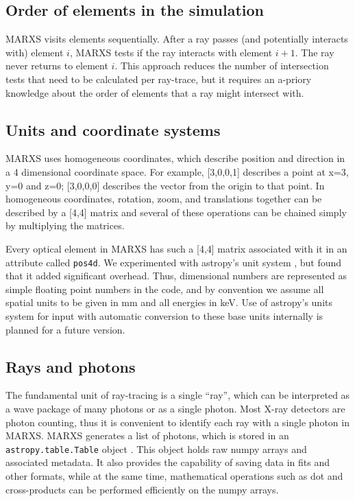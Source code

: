 \documentclass[twocolumn]{aastex61}
\begin{document}
\subsection{Order of elements in the simulation}
MARXS visits elements sequentially. After a ray passes (and potentially
interacts with) element $i$, MARXS tests if the ray interacts with element
$i+1$. The ray never returns to element $i$. This approach reduces the number
of intersection tests that need to be calculated per ray-trace, but it requires
an a-priory knowledge about the order of elements that a ray might intersect
with.

\subsection{Units and coordinate systems}
MARXS uses homogeneous coordinates, which describe position and direction in a
4 dimensional coordinate space. For example, [3,0,0,1] describes a point at
x=3, y=0 and z=0; [3,0,0,0] describes the vector from the origin to that
point. In homogeneous coordinates, rotation, zoom, and translations together can
be described by a [4,4] matrix and several of these operations can be chained
simply by multiplying the matrices.

Every optical element in MARXS has such a [4,4] matrix associated with it in an
attribute called \texttt{pos4d}. We experimented with astropy's unit system
\citep{2013A&A...558A..33A}, but found that it added significant
overhead. Thus, dimensional numbers are represented as simple floating point
numbers in the code, and by convention we assume all spatial units to be given
in mm and all energies in keV. Use of astropy's units system for input with
automatic conversion to these base units internally is planned for a future
version.

\subsection{Rays and photons}
The fundamental unit of ray-tracing is a single ``ray'', which can be
interpreted as a wave package of many photons or as a single
photon. Most X-ray detectors are photon counting, thus it is
convenient to identify each ray with a single photon in MARXS.
MARXS generates a list of photons, which is stored in an
\texttt{astropy.table.Table} object \citep{2013A&A...558A..33A}. This object
holds raw numpy arrays and associated metadata. It also provides the capability
of saving data in fits and other formats, while at the same time, mathematical
operations such as dot and cross-products can be performed efficiently on the
numpy arrays.
\end{document}
